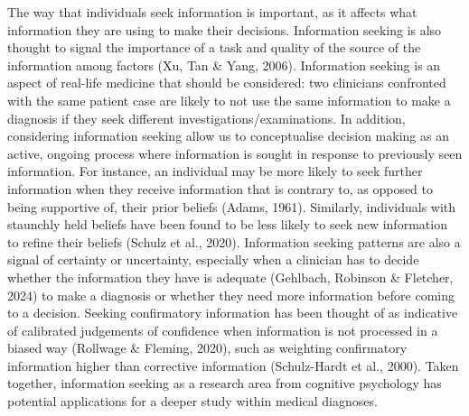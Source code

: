 \documentclass[a4paper, nobind]{templates/ociamthesis}
\begin{document}
The way that individuals seek information is important, as it affects what information they are using to make their decisions. Information seeking is also thought to signal the importance of a task and quality of the source of the information among factors (Xu, Tan \& Yang, 2006). Information seeking is an aspect of real-life medicine that should be considered: two clinicians confronted with the same patient case are likely to not use the same information to make a diagnosis if they seek different investigations/examinations. In addition, considering information seeking allow us to conceptualise decision making as an active, ongoing process where information is sought in response to previously seen information. For instance, an individual may be more likely to seek further information when they receive information that is contrary to, as opposed to being supportive of, their prior beliefs (Adams, 1961). Similarly, individuals with staunchly held beliefs have been found to be less likely to seek new information to refine their beliefs (Schulz et al., 2020). Information seeking patterns are also a signal of certainty or uncertainty, especially when a clinician has to decide whether the information they have is adequate (Gehlbach, Robinson \& Fletcher, 2024) to make a diagnosis or whether they need more information before coming to a decision. Seeking confirmatory information has been thought of as indicative of calibrated judgements of confidence when information is not processed in a biased way (Rollwage \& Fleming, 2020), such as weighting confirmatory information higher than corrective information (Schulz-Hardt et al., 2000). Taken together, information seeking as a research area from cognitive psychology has potential applications for a deeper study within medical diagnoses.\\
\end{document}
